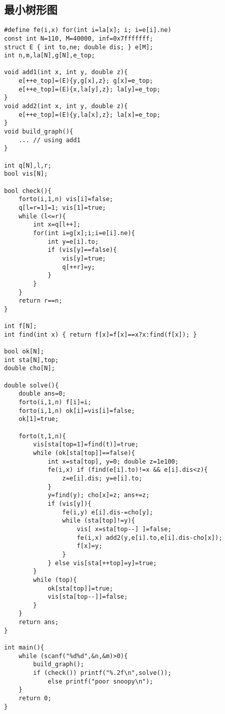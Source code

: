 \documentclass{article}
\begin{document}
\subsection{最小树形图}
\begin{lstlisting}
#define fe(i,x) for(int i=la[x]; i; i=e[i].ne)
const int N=110, M=40000, inf=0x7fffffff;
struct E { int to,ne; double dis; } e[M];
int n,m,la[N],g[N],e_top;

void add1(int x, int y, double z){
	e[++e_top]=(E){y,g[x],z}; g[x]=e_top;
	e[++e_top]=(E){x,la[y],z}; la[y]=e_top;
}
void add2(int x, int y, double z){
	e[++e_top]=(E){y,la[x],z}; la[x]=e_top;
}
void build_graph(){
	... // using add1
}

int q[N],l,r;
bool vis[N];

bool check(){
	forto(i,1,n) vis[i]=false;
	q[l=r=1]=1; vis[1]=true;
	while (l<=r){
		int x=q[l++];
		for(int i=g[x];i;i=e[i].ne){
			int y=e[i].to;
			if (vis[y]==false){
				vis[y]=true;
				q[++r]=y;
			}
		}
	}
	return r==n;
}

int f[N];
int find(int x) { return f[x]=f[x]==x?x:find(f[x]); }

bool ok[N];
int sta[N],top;
double cho[N];

double solve(){
	double ans=0;
	forto(i,1,n) f[i]=i;
	forto(i,1,n) ok[i]=vis[i]=false;
	ok[1]=true;
	
	forto(t,1,n){
		vis[sta[top=1]=find(t)]=true;
		while (ok[sta[top]]==false){
			int x=sta[top], y=0; double z=1e100;
			fe(i,x) if (find(e[i].to)!=x && e[i].dis<z){
				z=e[i].dis; y=e[i].to;
			}
			y=find(y); cho[x]=z; ans+=z;
			if (vis[y]){
				fe(i,y) e[i].dis-=cho[y];
				while (sta[top]!=y){
					vis[ x=sta[top--] ]=false;
					fe(i,x) add2(y,e[i].to,e[i].dis-cho[x]);
					f[x]=y;
				}
			} else vis[sta[++top]=y]=true;
		}
		while (top){
			ok[sta[top]]=true;
			vis[sta[top--]]=false;
		}
	}
	return ans;
}

int main(){
	while (scanf("%d%d",&n,&m)>0){
		build_graph();	
		if (check()) printf("%.2f\n",solve());
			else printf("poor snoopy\n");
	}
	return 0;
}
\end{lstlisting}
\end{document}

